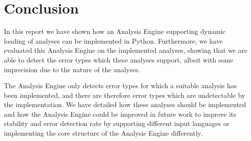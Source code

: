 \section{Conclusion}

In this report we have shown how an Analysis Engine supporting dynamic loading of analyses can be implemented in Python. Furthermore, we have evaluated this Analysis Engine on the implemented analyses, showing that we are able to detect the error types which these analyses support, albeit with some imprecision due to the nature of the analyses. 

\newpar The Analysis Engine only detects error types for which a suitable analysis has been implemented, and there are therefore error types which are undetectable by the implementation. We have detailed how these analyses should be implemented and how the Analysis Engine could be improved in future work to improve its stability and error detection rate by supporting different input languages or implementing the core structure of the Analysis Engine differently.